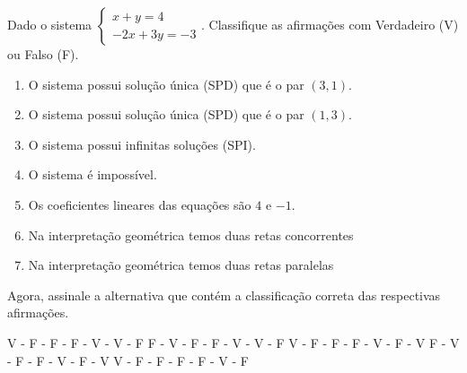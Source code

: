 Dado o sistema $\left\{ \begin{array}{l}
x+y=4\\
-2x+3y=-3
\end{array} \right.$. Classifique as afirmações com Verdadeiro (V) ou Falso (F).
\begin{enumerate}[(\quad)]
\item O sistema possui solução única (SPD) que é o par $(3,1)$.
\item O sistema possui solução única (SPD) que é o par $(1,3)$.
\item O sistema possui infinitas soluções (SPI).
\item O sistema é impossível.
\item Os coeficientes lineares das equações são $4$ e $-1$.
\item Na interpretação geométrica temos duas retas concorrentes
\item Na interpretação geométrica temos duas retas paralelas
\end{enumerate}
Agora, assinale a alternativa que contém a classificação correta das respectivas afirmações.

V - F - F - F - V - V - F
F - V - F - F - V - V - F
V - F - F - F - V - F - V
F - V - F - F - V - F - V
V - F - F - F - F - V - F


